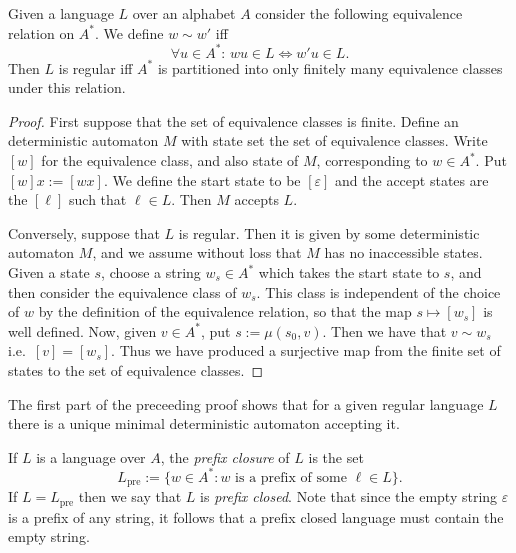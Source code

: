 \begin{thm} Given a language $L$ over an alphabet $A$
    consider the following equivalence relation on $A^*$. We define $w \sim w'$
    iff \[ \forall u\in A^*:\, wu\in L \Leftrightarrow w'u \in L.\]
    Then $L$ is regular iff $A^*$ is partitioned into only finitely
    many equivalence classes under this relation.
\end{thm}
\begin{proof} First suppose that the set of equivalence classes is
    finite. Define an deterministic automaton $M$ with state set the set of
    equivalence classes. Write $[w]$ for the equivalence class, and
    also state of $M$, corresponding to $w\in A^*$. Put $[w]x :=
    [wx].$ We define the start state to be $[\varepsilon]$ and the
    accept states are the $[\ell ]$ such that $\ell \in L$. Then $M$
    accepts $L$.

    Conversely, suppose that $L$ is regular. Then it is given by some
    deterministic automaton $M$, and we assume without loss that $M$
    has no inaccessible states. Given a state $s$, choose a string
    $w_s\in A^*$ which takes the start state to $s$, and then consider
    the equivalence class of $w_s$. This class is independent of the
    choice of $w$ by the definition of the equivalence relation, so
    that the map $s\mapsto [w_s]$ is well defined. Now, given $v\in
    A^*$, put $s := \mu(s_0,v)$. Then we have that $v\sim w_s$
    i.e.~$[v] = [w_s]$.  Thus we have produced a surjective map from
    the finite set of states to the set of equivalence classes.
\end{proof}

\begin{rem} The first part of the preceeding proof shows that for a
    given regular language $L$ there is a unique minimal deterministic
    automaton accepting it.
\end{rem}

\begin{defn} If $L$ is a language over $A$, the \emph{prefix closure}
    of $L$ is the set \[L_{\text{pre}} := \{w \in A^* : w \text{ is a
    prefix of some } \ell \in L \}.\] If $L=L_{\text{pre}}$ then we
    say that $L$ is \emph{prefix closed}. Note that since the empty
    string $\varepsilon$ is a prefix of any string, it follows that a
    prefix closed language must contain the empty string.
\end{defn}

